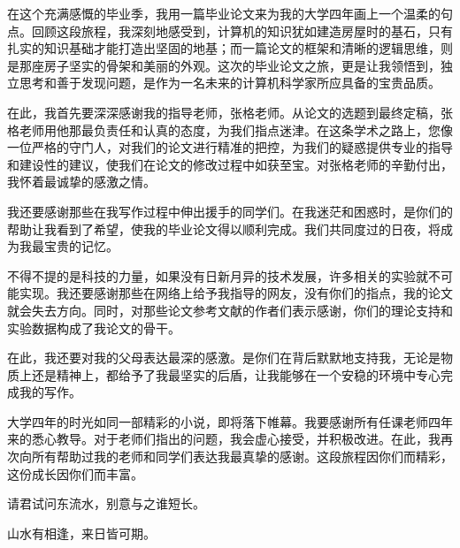 \begin{ack}
	在这个充满感慨的毕业季，我用一篇毕业论文来为我的大学四年画上一个温柔的句点。回顾这段旅程，我深刻地感受到，计算机的知识犹如建造房屋时的基石，只有扎实的知识基础才能打造出坚固的地基；而一篇论文的框架和清晰的逻辑思维，则是那座房子坚实的骨架和美丽的外观。这次的毕业论文之旅，更是让我领悟到，独立思考和善于发现问题，是作为一名未来的计算机科学家所应具备的宝贵品质。

	在此，我首先要深深感谢我的指导老师，张格老师。从论文的选题到最终定稿，张格老师用他那最负责任和认真的态度，为我们指点迷津。在这条学术之路上，您像一位严格的守门人，对我们的论文进行精准的把控，为我们的疑惑提供专业的指导和建设性的建议，使我们在论文的修改过程中如获至宝。对张格老师的辛勤付出，我怀着最诚挚的感激之情。

	我还要感谢那些在我写作过程中伸出援手的同学们。在我迷茫和困惑时，是你们的帮助让我看到了希望，使我的毕业论文得以顺利完成。我们共同度过的日夜，将成为我最宝贵的记忆。

	不得不提的是科技的力量，如果没有日新月异的技术发展，许多相关的实验就不可能实现。我还要感谢那些在网络上给予我指导的网友，没有你们的指点，我的论文就会失去方向。同时，对那些论文参考文献的作者们表示感谢，你们的理论支持和实验数据构成了我论文的骨干。

	在此，我还要对我的父母表达最深的感激。是你们在背后默默地支持我，无论是物质上还是精神上，都给予了我最坚实的后盾，让我能够在一个安稳的环境中专心完成我的写作。

	大学四年的时光如同一部精彩的小说，即将落下帷幕。我要感谢所有任课老师四年来的悉心教导。对于老师们指出的问题，我会虚心接受，并积极改进。在此，我再次向所有帮助过我的老师和同学们表达我最真挚的感谢。这段旅程因你们而精彩，这份成长因你们而丰富。

	\begin{center}
		请君试问东流水，别意与之谁短长。

		山水有相逢，来日皆可期。
	\end{center}

\end{ack}
